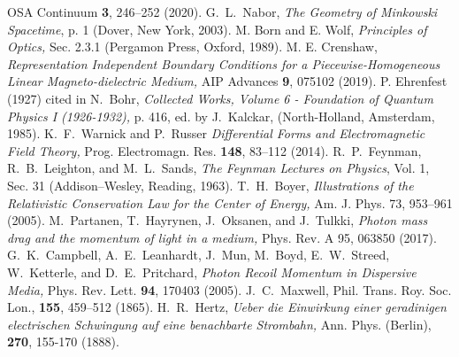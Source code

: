 \documentclass[twocolumn,amssymb,eqsecnum,aps,pra]{revtex4-2}
\begin{document}
\begin{thebibliography}{1}
OSA Continuum
\textbf{3}, 246--252 (2020).
G.~L.~Nabor,
\textit{The {G}eometry of {M}inkowski {S}pacetime}, p. 1
(Dover, New York, 2003).
M. Born and E. Wolf, 
\textit{Principles of Optics,}
Sec. 2.3.1 (Pergamon Press, Oxford, 1989).
M. E. Crenshaw,
\textit{Representation Independent Boundary Conditions for a Piecewise-Homogeneous Linear Magneto-dielectric Medium,}
AIP Advances
\textbf{9}, 075102 (2019).
P. Ehrenfest (1927) cited in N.~Bohr,
\textit{Collected {W}orks, {V}olume 6 - {F}oundation of {Q}uantum {P}hysics {I} (1926-1932),} p. 416,
ed. by J.~Kalckar, 
(North-Holland, Amsterdam, 1985).
K.~F.~Warnick and P.~Russer
\textit{Differential Forms and Electromagnetic Field Theory,}
Prog. Electromagn. Res.
\textbf{148}, 83--112 (2014).
R.~P.~Feynman, R.~B.~Leighton, and M.~L.~Sands,
\textit{The {F}eynman {L}ectures on {P}hysics}, Vol. 1, Sec. 31
(Addison--Wesley, Reading, 1963).
T.~H.~Boyer,
\textit{Illustrations of the Relativistic Conservation Law for the Center of Energy,}
Am. J. Phys. 73, 953--961 (2005).
M.~Partanen, T.~Hayrynen, J.~Oksanen, and J.~Tulkki,
\textit{Photon mass drag and the momentum of light in a medium,}
Phys. Rev. A 95, 063850 (2017).
G.~K.~Campbell, A.~E.~Leanhardt, J.~Mun, M.~Boyd, E.~W.~Streed, W.~Ketterle, and D.~E.~Pritchard,
\textit{Photon Recoil Momentum in Dispersive Media,}
Phys. Rev. Lett. \textbf{94}, 170403 (2005).
J.~C.~Maxwell,
Phil. Trans. Roy. Soc. Lon., \textbf{155}, 459--512 (1865).
H.~R.~Hertz,
\textit{Ueber die Einwirkung einer geradinigen electrischen Schwingung auf eine benachbarte Strombahn,}
Ann. Phys. (Berlin), \textbf{270}, 155-170 (1888).
\end{thebibliography}
\end{document}
